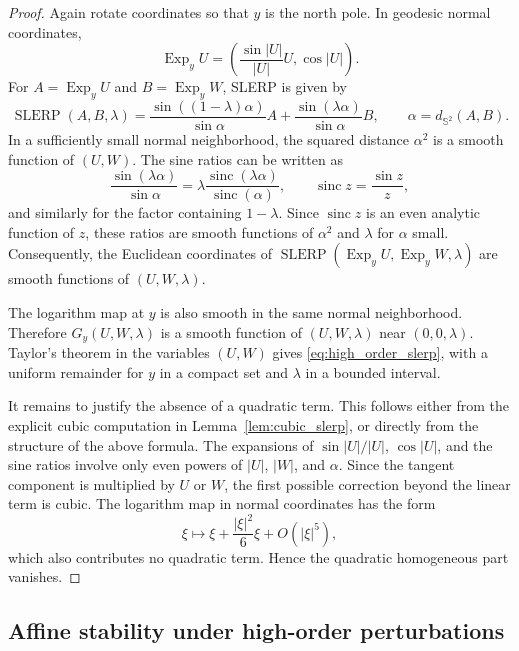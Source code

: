 \documentclass[a4paper,11pt]{article}
\newcommand{\bS}{\mathbb{S}}
\newcommand{\Exp}{\operatorname{Exp}}
\newcommand{\SLERP}{\operatorname{SLERP}}
\numberwithin{equation}{section}
\begin{document}
\begin{proof}
Again rotate coordinates so that \(y\) is the north pole.  In geodesic normal
coordinates,
\[
        \Exp_y U
        =
        \left(\frac{\sin |U|}{|U|}U,\cos |U|\right).
\]
For \(A=\Exp_yU\) and \(B=\Exp_yW\), SLERP is given by
\[
        \SLERP(A,B,\lambda)
        =
        \frac{\sin((1-\lambda)\alpha)}{\sin\alpha}A
        +
        \frac{\sin(\lambda\alpha)}{\sin\alpha}B,
        \qquad
        \alpha=d_{\bS^2}(A,B).
\]
In a sufficiently small normal neighborhood, the squared distance
\(\alpha^2\) is a smooth function of \((U,W)\).  The sine ratios can be written
as
\[
        \frac{\sin(\lambda\alpha)}{\sin\alpha}
        =
        \lambda
        \frac{\operatorname{sinc}(\lambda\alpha)}
             {\operatorname{sinc}(\alpha)},
        \qquad
        \operatorname{sinc} z=\frac{\sin z}{z},
\]
and similarly for the factor containing \(1-\lambda\).  Since
\(\operatorname{sinc} z\) is an even analytic function of \(z\), these ratios
are smooth functions of \(\alpha^2\) and \(\lambda\) for \(\alpha\) small.
Consequently, the Euclidean coordinates of
\(\SLERP(\Exp_yU,\Exp_yW,\lambda)\) are smooth functions of
\((U,W,\lambda)\).

The logarithm map at \(y\) is also smooth in the same normal neighborhood.
Therefore \(G_y(U,W,\lambda)\) is a smooth function of \((U,W,\lambda)\) near
\((0,0,\lambda)\).  Taylor's theorem in the variables \((U,W)\) gives
\eqref{eq:high_order_slerp}, with a uniform remainder for \(y\) in a compact
set and \(\lambda\) in a bounded interval.

It remains to justify the absence of a quadratic term.  This follows either
from the explicit cubic computation in Lemma~\ref{lem:cubic_slerp}, or directly
from the structure of the above formula.  The expansions of
\(\sin |U|/|U|\), \(\cos|U|\), and the sine ratios involve only even powers of
\(|U|\), \(|W|\), and \(\alpha\).  Since the tangent component is multiplied by
\(U\) or \(W\), the first possible correction beyond the linear term is cubic.
The logarithm map in normal coordinates has the form
\[
        \xi\mapsto \xi+\frac{|\xi|^2}{6}\xi+O(|\xi|^5),
\]
which also contributes no quadratic term.  Hence the quadratic homogeneous
part vanishes.
\end{proof}

\subsection{Affine stability under high-order perturbations}
\end{document}
